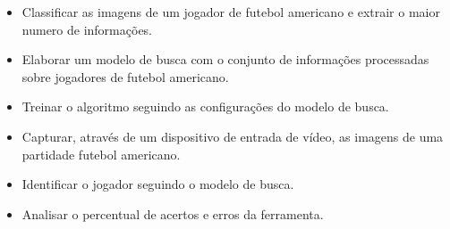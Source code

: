 \begin{block}{}
\begin{itemize}
\item Classificar as imagens de um jogador de futebol americano e extrair o maior numero de informações.

\item Elaborar um modelo de busca com o conjunto de informações processadas sobre jogadores de futebol americano.

\item Treinar o algoritmo seguindo as configurações do modelo de busca.
   
\item Capturar, através de um dispositivo de entrada de vídeo, as imagens de uma partidade futebol americano.
   
\item Identificar o jogador seguindo o modelo de busca.
   
\item Analisar o percentual de acertos e erros da ferramenta.

\end{itemize}
\end{block}